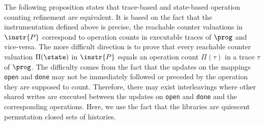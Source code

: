 The following proposition states that trace-based and state-based operation counting refinement
are equivalent. It is based on the fact that the instrumentation defined above is precise, \ie  
the reachable counter valuations in $\instr{P}$ correspond to operation counts in executable traces 
of $\prog$ and vice-versa. The more difficult direction is to prove 
that every reachable counter valuation $\Pi(\state)$ in $\instr{P}$ equals
an operation count $\Pi(\tau)$ in a trace $\tau$ of $\prog$. The difficulty comes from the fact that  
the updates on the mappings {\tt open} and {\tt done} may not be immediately followed or preceded by the 
operation they are supposed to count. 
Therefore, there may exist interleavings where
other shared writes are executed between the updates on {\tt open} and {\tt done} and the corresponding operations.
Here, we use the fact that the libraries are quiescent permutation closed sets of histories.

